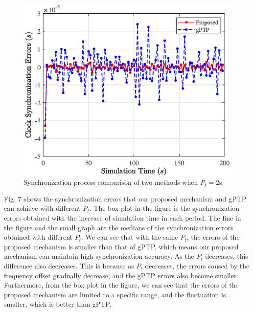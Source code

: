 \documentclass[conference]{IEEEtran}
\begin{document}
\begin{figure}[htbp]
	\centerline{\includegraphics[scale=0.6]{fig6.eps}}
	\caption{Synchronization process comparison of two methods when $P_t=2$s.}
	\label{fig6}
\end{figure}

Fig. 7 shows the synchronization errors that our proposed mechanism and gPTP can achieve with different $ P_t $. The box plot in the figure is the synchronization errors obtained with the increase of simulation time in each period. The line in the figure and the small graph are the medians of the synchronization errors obtained with different $ P_t $. We can see that with the same $P_t$, the errors of the proposed mechanism is smaller than that of gPTP, which means our proposed mechanism can maintain high synchronization accuracy. As the $P_t$ decreases, this difference also decreases. This is because as $ P_t $ decreases, the errors caused by the frequency offset gradually decrease, and the gPTP errors also become smaller. Furthermore, from the box plot in the figure, we can see that the errors of the proposed mechanism are limited to a specific range, and the fluctuation is smaller, which is better than gPTP.
\end{document}
